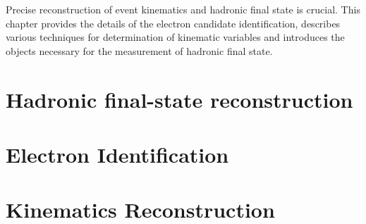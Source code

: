 Precise reconstruction of event kinematics and hadronic final state is crucial. This chapter provides the details of the electron candidate identification, describes various techniques for determination of kinematic variables and introduces the objects necessary for the measurement of hadronic final state. 

\section{Hadronic final-state reconstruction}
\label{sec:hadronreco}


\section{Electron Identification}
\label{sec:eleid}


\section{Kinematics Reconstruction}
\label{sec:kinrec}



